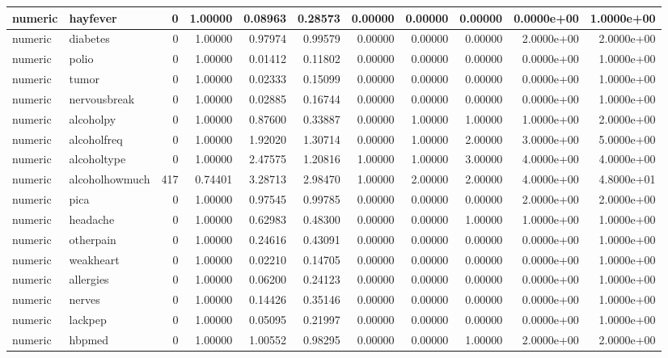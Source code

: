 \documentclass[12pt, krantz2,]{krantz}
\theoremstyle{definition}
\theoremstyle{definition}
\theoremstyle{definition}
\newcommand{\1}{\mathbbm{1}}
\begin{document}
\begin{tabular}{l|l|r|r|r|r|r|r|r|r|r}
\hline
numeric & hayfever & 0 & 1.00000 & 0.08963 & 0.28573 & 0.00000 & 0.00000 & 0.00000 & 0.0000e+00 & 1.0000e+00\\
\hline
numeric & diabetes & 0 & 1.00000 & 0.97974 & 0.99579 & 0.00000 & 0.00000 & 0.00000 & 2.0000e+00 & 2.0000e+00\\
\hline
numeric & polio & 0 & 1.00000 & 0.01412 & 0.11802 & 0.00000 & 0.00000 & 0.00000 & 0.0000e+00 & 1.0000e+00\\
\hline
numeric & tumor & 0 & 1.00000 & 0.02333 & 0.15099 & 0.00000 & 0.00000 & 0.00000 & 0.0000e+00 & 1.0000e+00\\
\hline
numeric & nervousbreak & 0 & 1.00000 & 0.02885 & 0.16744 & 0.00000 & 0.00000 & 0.00000 & 0.0000e+00 & 1.0000e+00\\
\hline
numeric & alcoholpy & 0 & 1.00000 & 0.87600 & 0.33887 & 0.00000 & 1.00000 & 1.00000 & 1.0000e+00 & 2.0000e+00\\
\hline
numeric & alcoholfreq & 0 & 1.00000 & 1.92020 & 1.30714 & 0.00000 & 1.00000 & 2.00000 & 3.0000e+00 & 5.0000e+00\\
\hline
numeric & alcoholtype & 0 & 1.00000 & 2.47575 & 1.20816 & 1.00000 & 1.00000 & 3.00000 & 4.0000e+00 & 4.0000e+00\\
\hline
numeric & alcoholhowmuch & 417 & 0.74401 & 3.28713 & 2.98470 & 1.00000 & 2.00000 & 2.00000 & 4.0000e+00 & 4.8000e+01\\
\hline
numeric & pica & 0 & 1.00000 & 0.97545 & 0.99785 & 0.00000 & 0.00000 & 0.00000 & 2.0000e+00 & 2.0000e+00\\
\hline
numeric & headache & 0 & 1.00000 & 0.62983 & 0.48300 & 0.00000 & 0.00000 & 1.00000 & 1.0000e+00 & 1.0000e+00\\
\hline
numeric & otherpain & 0 & 1.00000 & 0.24616 & 0.43091 & 0.00000 & 0.00000 & 0.00000 & 0.0000e+00 & 1.0000e+00\\
\hline
numeric & weakheart & 0 & 1.00000 & 0.02210 & 0.14705 & 0.00000 & 0.00000 & 0.00000 & 0.0000e+00 & 1.0000e+00\\
\hline
numeric & allergies & 0 & 1.00000 & 0.06200 & 0.24123 & 0.00000 & 0.00000 & 0.00000 & 0.0000e+00 & 1.0000e+00\\
\hline
numeric & nerves & 0 & 1.00000 & 0.14426 & 0.35146 & 0.00000 & 0.00000 & 0.00000 & 0.0000e+00 & 1.0000e+00\\
\hline
numeric & lackpep & 0 & 1.00000 & 0.05095 & 0.21997 & 0.00000 & 0.00000 & 0.00000 & 0.0000e+00 & 1.0000e+00\\
\hline
numeric & hbpmed & 0 & 1.00000 & 1.00552 & 0.98295 & 0.00000 & 0.00000 & 1.00000 & 2.0000e+00 & 2.0000e+00\\

\end{tabular}
\end{document}
